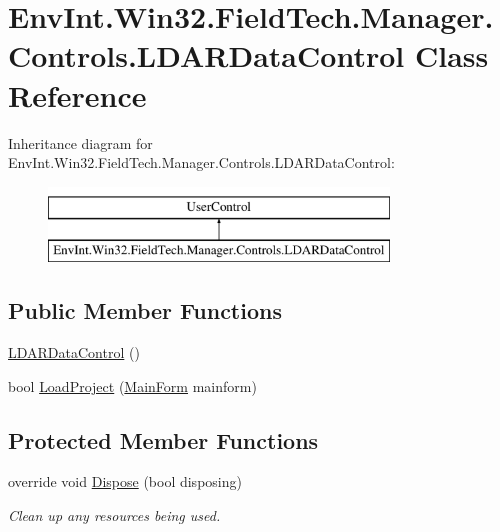 \hypertarget{class_env_int_1_1_win32_1_1_field_tech_1_1_manager_1_1_controls_1_1_l_d_a_r_data_control}{}\section{Env\+Int.\+Win32.\+Field\+Tech.\+Manager.\+Controls.\+L\+D\+A\+R\+Data\+Control Class Reference}
\label{class_env_int_1_1_win32_1_1_field_tech_1_1_manager_1_1_controls_1_1_l_d_a_r_data_control}
Inheritance diagram for Env\+Int.\+Win32.\+Field\+Tech.\+Manager.\+Controls.\+L\+D\+A\+R\+Data\+Control\+:\begin{figure}[H]
\begin{center}
\leavevmode
\includegraphics[height=2.000000cm]{class_env_int_1_1_win32_1_1_field_tech_1_1_manager_1_1_controls_1_1_l_d_a_r_data_control}
\end{center}
\end{figure}
\subsection*{Public Member Functions}
\begin{DoxyCompactItemize}
\item 
\hyperlink{class_env_int_1_1_win32_1_1_field_tech_1_1_manager_1_1_controls_1_1_l_d_a_r_data_control_a7925988f094a4b9eaa67563d7de9d9ef}{L\+D\+A\+R\+Data\+Control} ()
\item 
bool \hyperlink{class_env_int_1_1_win32_1_1_field_tech_1_1_manager_1_1_controls_1_1_l_d_a_r_data_control_a3dc939683251c9c080173f6afb191d48}{Load\+Project} (\hyperlink{class_env_int_1_1_win32_1_1_field_tech_1_1_manager_1_1_main_form}{Main\+Form} mainform)
\end{DoxyCompactItemize}
\subsection*{Protected Member Functions}
\begin{DoxyCompactItemize}
\item 
override void \hyperlink{class_env_int_1_1_win32_1_1_field_tech_1_1_manager_1_1_controls_1_1_l_d_a_r_data_control_a5d670a12d60fc68b02c7a81c36e1aa46}{Dispose} (bool disposing)
\begin{DoxyCompactList}\small\item\em Clean up any resources being used. \end{DoxyCompactList}\end{DoxyCompactItemize}


